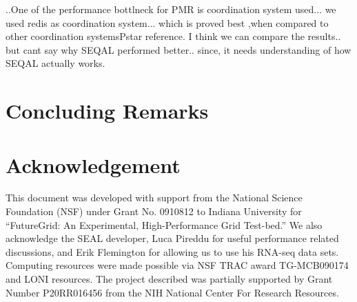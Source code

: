 \documentclass{sig-alternate}
\begin{document}
..One of the performance bottlneck for PMR is coordination system used... we used redis as coordination system... which is proved best ,when compared to other coordination systems{Pstar reference}. I think we can compare the results.. but cant say why SEQAL performed better.. since, it needs understanding of how SEQAL actually works.




\section{Concluding Remarks}


%  



\section*{Acknowledgement}
This document was developed with support from the National Science
Foundation (NSF) under Grant No.  0910812 to Indiana University for
``FutureGrid: An Experimental, High-Performance Grid Test-bed.''  We
also acknowledge the SEAL developer, Luca Pireddu for useful performance related
discussions, and Erik Flemington for allowing us to use his RNA-seq data sets. Computing resources were made possible via NSF TRAC award TG-MCB090174 and LONI resources.  The project described was partially
supported by Grant Number P20RR016456 from the NIH National Center For
Research Resources.

 

\end{document}
